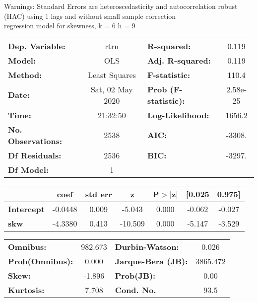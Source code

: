 Warnings: \newline
 [1] Standard Errors are heteroscedasticity and autocorrelation robust (HAC) using 1 lags and without small sample correction\\ 

regression model for skewness, k = 6 h = 9\begin{center}
\begin{tabular}{lclc}
\toprule
\textbf{Dep. Variable:}    &       rtrn       & \textbf{  R-squared:         } &     0.119   \\
\textbf{Model:}            &       OLS        & \textbf{  Adj. R-squared:    } &     0.119   \\
\textbf{Method:}           &  Least Squares   & \textbf{  F-statistic:       } &     110.4   \\
\textbf{Date:}             & Sat, 02 May 2020 & \textbf{  Prob (F-statistic):} &  2.58e-25   \\
\textbf{Time:}             &     21:32:50     & \textbf{  Log-Likelihood:    } &    1656.2   \\
\textbf{No. Observations:} &        2538      & \textbf{  AIC:               } &    -3308.   \\
\textbf{Df Residuals:}     &        2536      & \textbf{  BIC:               } &    -3297.   \\
\textbf{Df Model:}         &           1      & \textbf{                     } &             \\
\bottomrule
\end{tabular}
\begin{tabular}{lcccccc}
                   & \textbf{coef} & \textbf{std err} & \textbf{z} & \textbf{P$> |$z$|$} & \textbf{[0.025} & \textbf{0.975]}  \\
\midrule
\textbf{Intercept} &      -0.0448  &        0.009     &    -5.043  &         0.000        &       -0.062    &       -0.027     \\
\textbf{skw}       &      -4.3380  &        0.413     &   -10.509  &         0.000        &       -5.147    &       -3.529     \\
\bottomrule
\end{tabular}
\begin{tabular}{lclc}
\textbf{Omnibus:}       & 982.673 & \textbf{  Durbin-Watson:     } &    0.026  \\
\textbf{Prob(Omnibus):} &   0.000 & \textbf{  Jarque-Bera (JB):  } & 3865.472  \\
\textbf{Skew:}          &  -1.896 & \textbf{  Prob(JB):          } &     0.00  \\
\textbf{Kurtosis:}      &   7.708 & \textbf{  Cond. No.          } &     93.5  \\
\bottomrule
\end{tabular}
\end{center}


